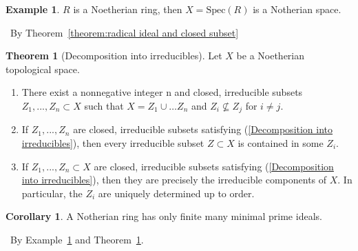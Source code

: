 \documentclass[a4paper,12pt]{article}
\newenvironment{prooff}{{\noindent\it\textcolor{cyan!40!black}{Proof}:}\,}{\par}
\newcommand{\spec}[1]{\text{Spec}({#1})}
\theoremstyle{definition}
\newtheorem{coro}[defn]{Corollary}
\newtheorem{theo}[defn]{Theorem}
\newtheorem{exam}[defn]{Example}
\begin{document}
\begin{exam}
    $R$ is a Noetherian ring, then $X=\spec{R}$ is a Notherian space.
\end{exam}
\begin{prooff}
    By Theorem~\ref{theorem:radical ideal and closed subset}
\end{prooff}
\begin{theo}[Decomposition into irreducibles]
    Let $X$ be a Noetherian topological space.
    \begin{enumerate}[(1)]
        \item There exist a nonnegative integer n and closed, irreducible subsets
              $Z_1,...,Z_n\subset X$ such that $X=Z_1\cup\dots Z_n$ and $Z_i\nsubseteq Z_j$ for $i\neq j$.
              \label{Decomposition into irreducibles}
        \item If $Z_1,...,Z_n$ are closed, irreducible subsets satisfying (\ref{Decomposition into irreducibles}), then
              every irreducible subset $Z\subset X$ is contained in some $Z_i$.
        \item If $Z_1,...,Z_n\subset X$ are closed, irreducible subsets satisfying (\ref{Decomposition into irreducibles}), then
              they are precisely the irreducible components of $X$. In particular, the
              $Z_i$ are uniquely determined up to order.
    \end{enumerate}
    \label{theorem:Decomposition into irreducibles}
\end{theo}
\begin{coro}
    A Notherian ring has only finite many minimal prime ideals.
    \label{example:Spec of Notherian ring is irr}
\end{coro}
\begin{prooff}
    By Example~\ref{example:Spec of Notherian ring is irr} and Theorem~\ref{theorem:Decomposition into irreducibles}.
\end{prooff}



\newpage
\end{document}
